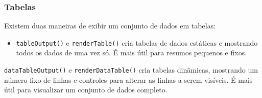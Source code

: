 \documentclass[
]{book}
\newenvironment{Shaded}{\begin{snugshade}}{\end{snugshade}}
\newcommand{\AttributeTok}[1]{\textcolor[rgb]{0.77,0.63,0.00}{#1}}
\newcommand{\ControlFlowTok}[1]{\textcolor[rgb]{0.13,0.29,0.53}{\textbf{#1}}}
\newcommand{\DecValTok}[1]{\textcolor[rgb]{0.00,0.00,0.81}{#1}}
\newcommand{\FunctionTok}[1]{\textcolor[rgb]{0.00,0.00,0.00}{#1}}
\newcommand{\NormalTok}[1]{#1}
\newcommand{\OtherTok}[1]{\textcolor[rgb]{0.56,0.35,0.01}{#1}}
\newcommand{\SpecialCharTok}[1]{\textcolor[rgb]{0.00,0.00,0.00}{#1}}
\newcommand{\StringTok}[1]{\textcolor[rgb]{0.31,0.60,0.02}{#1}}
\providecommand{\tightlist}{%
  \setlength{\itemsep}{0pt}\setlength{\parskip}{0pt}}
\begin{document}
\begin{Shaded}
\end{Shaded}

\hypertarget{tabelas}{%
\subsubsection{\texorpdfstring{\textbf{Tabelas}}{Tabelas}}\label{tabelas}}

Existem duas maneiras de exibir um conjunto de dados em tabelas:

\begin{itemize}
\tightlist
\item
  \texttt{tableOutput()} e \texttt{renderTable()} cria tabelas de dados estáticas e mostrando todos os dados de uma vez só. É mais útil para resumos pequenos e fixos.
\end{itemize}

\texttt{dataTableOutput()} e \texttt{renderDataTable()} cria tabelas dinâmicas, mostrando um número fixo de linhas e controles para alterar as linhas a serem visíveis. É mais útil para visualizar um conjunto de dados completo.
\end{document}

